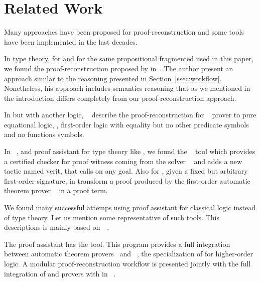 \documentclass[../main.tex]{subfiles}
\begin{document}

\section{Related Work}
\label{sec:related-work}




Many approaches have been proposed for proof-reconstruction and some tools have been
implemented in the last decades.

In type theory, for \Agda and  for the same propositional fragmented used in this paper,
we found the proof-reconstruction proposed by \citeauthor{Kanso2012}
in~\cite{Kanso2012,kanso2016light}. The author present an approach similar to
the reasoning presented in Section~\ref{ssec:workflow}.
Nonetheless, his approach includes semantics reasoning that as we mentioned
in the introduction differs completely from our proof-reconstruction approach.

In \Agda but with another logic, \citeauthor{foster2011integrating}~\cite{foster2011integrating}
describe the proof-reconstruction for ~\cite{hillenbrand1997}
prover to pure equational logic, \ie,
first-order logic with equality but no other predicate symbols and no
functions symbols.

In ~\cite{coqteam}, and proof assistant for type theory like \Agda, 
we found the ~\cite{armand2011,Ekici2017} tool which provides a
certified checker for proof witness coming from the \SMT solver
~\cite{bouton2009} and adds a new tactic named verit,
that calls  on any  goal.
Also for , 
given a fixed but arbitrary first-order signature,
\citeauthor{Bezem2002} in \cite{Bezem2002}
transform a proof produced by the first-order automatic theorem
prover ~\cite{deNivelle2003} in a  proof
term.

We found many successful attemps using proof assistant for classical logic
instead of type theory.
Let us mention some representative of such tools. This descriptions is
mainly based on~\citeauthor{Sicard-Ramirez2016}~\cite{Sicard-Ramirez2016}.

The  proof assistant has the  tool.
This program provides a full integration between
automatic theorem provers~\cite{blanchette2013extending,Fleury2014,bohme2010} and
~\cite{nipkow2002isabelle}, the specialization of
 for higher-order logic.
A modular proof-reconstruction workflow is presented jointly with
the full integration of  and  provers with
 in \citeauthor{Een2004}~\cite{Een2004}.
\end{document}
